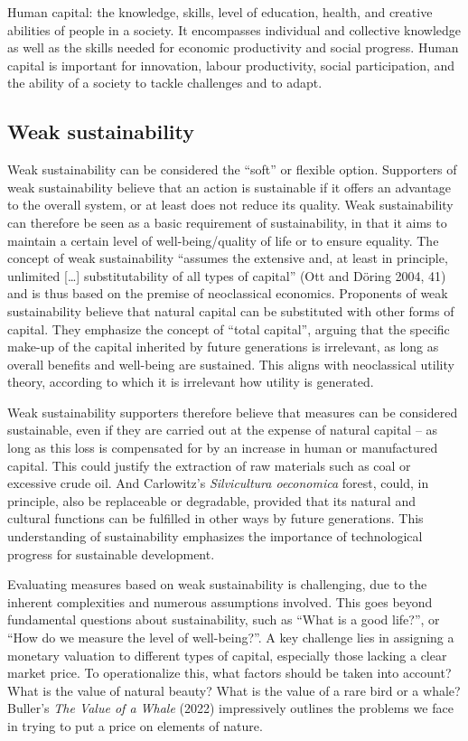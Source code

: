 \documentclass[
  a4paper,
  openany]{book}
\begin{document}
Human capital: the knowledge, skills, level of education, health, and
creative abilities of people in a society. It encompasses individual and
collective knowledge as well as the skills needed for economic
productivity and social progress. Human capital is important for
innovation, labour productivity, social participation, and the ability
of a society to tackle challenges and to adapt.

\subsection{Weak sustainability}\label{weak-sustainability}

Weak sustainability can be considered the ``soft'' or flexible option.
Supporters of weak sustainability believe that an action is sustainable
if it offers an advantage to the overall system, or at least does not
reduce its quality. Weak sustainability can therefore be seen as a basic
requirement of sustainability, in that it aims to maintain a certain
level of well-being/quality of life or to ensure equality. The concept
of weak sustainability ``assumes the extensive and, at least in
principle, unlimited {[}\ldots{]} substitutability of all types of
capital'' (Ott and Döring 2004, 41) and is thus based on the premise of
neoclassical economics. Proponents of weak sustainability believe that
natural capital can be substituted with other forms of capital. They
emphasize the concept of ``total capital'', arguing that the specific
make-up of the capital inherited by future generations is irrelevant, as
long as overall benefits and well-being are sustained. This aligns with
neoclassical utility theory, according to which it is irrelevant how
utility is generated.

Weak sustainability supporters therefore believe that measures can be
considered sustainable, even if they are carried out at the expense of
natural capital -- as long as this loss is compensated for by an
increase in human or manufactured capital. This could justify the
extraction of raw materials such as coal or excessive crude oil. And
Carlowitz's \emph{Silvicultura oeconomica} forest, could, in principle,
also be replaceable or degradable, provided that its natural and
cultural functions can be fulfilled in other ways by future generations.
This understanding of sustainability emphasizes the importance of
technological progress for sustainable development.

Evaluating measures based on weak sustainability is challenging, due to
the inherent complexities and numerous assumptions involved. This goes
beyond fundamental questions about sustainability, such as ``What is a
good life?'', or ``How do we measure the level of well-being?''. A key
challenge lies in assigning a monetary valuation to different types of
capital, especially those lacking a clear market price. To
operationalize this, what factors should be taken into account? What is
the value of natural beauty? What is the value of a rare bird or a
whale? Buller's \emph{The Value of a Whale} (2022) impressively outlines
the problems we face in trying to put a price on elements of nature.
\end{document}
